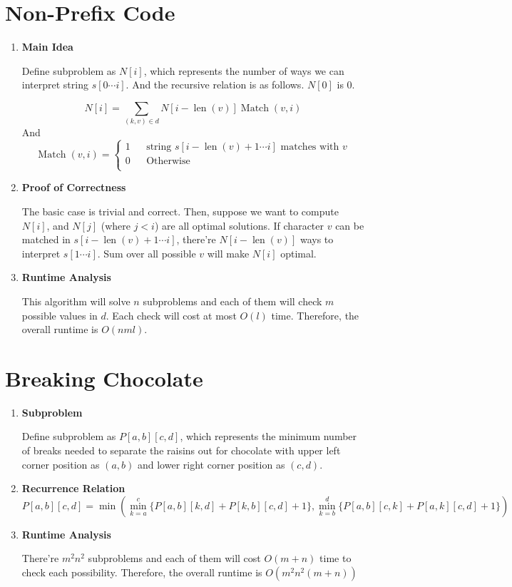 \documentclass[11pt]{article}
\newenvironment{qparts}{\begin{enumerate}[{(}a{)}]}{\end{enumerate}}
\begin{document}
\section{Non-Prefix Code}
\begin{qparts}
	\item \textbf{Main Idea}
	
	Define subproblem as $N[i]$, which represents the number of ways we can interpret string $s[0 \cdots i]$. And the recursive relation is as follows. $N[0]$ is 0.
	
	\[
		N[i] = \sum_{(k, v) \in d} N[i - \operatorname{len}(v)] \operatorname{Match}(v, i)
	\]
	And
	\[ \operatorname{Match}(v, i) = 
	\left\{
		\begin{array}{rcl}
			1     &      & \text{string } s[i - \operatorname{len}(v) + 1 \cdots i] \text{ matches with } v  \\
			0      &      & \text{Otherwise}  \\
		\end{array}
	\right.
	\]
	\item \textbf{Proof of Correctness}
	
	The basic case is trivial and correct. Then, suppose we want to compute $N[i]$, and $N[j]$ (where $j<i$) are all optimal solutions. If character $v$ can be matched in $s[i - \operatorname{len}(v) + 1 \cdots i]$, there're $N[i - \operatorname{len}(v)]$ ways to interpret $s[1 \cdots i]$. Sum over all possible $v$ will make $N[i]$ optimal.
	
	
	\item \textbf{Runtime Analysis}
	
	This algorithm will solve $n$ subproblems and each of them will check $m$ possible values in $d$. Each check will cost at most $O(l)$ time. Therefore, the overall runtime is $O(nml)$.
	

\end{qparts}


\newpage
\section{Breaking Chocolate}
\begin{qparts}
	\item \textbf{Subproblem}
	
	Define subproblem as $P[a,b][c, d]$, which represents the minimum 	number of breaks needed to separate the raisins out for chocolate with upper left corner position as $(a, b)$ and lower right corner position as $(c, d)$.
	
	\item \textbf{Recurrence Relation}
	\[
		P[a,b][c,d] = \min( \min_{k=a}^{c}\{ P[a, b][k, d] + P[k, b][c, d] + 1 \}, \min_{k=b}^{d}\{ P[a, b][c, k] + P[a, k][c, d] + 1 \})
	\]
	
	\item \textbf{Runtime Analysis}
	
	There're $m^2n^2$ subproblems and each of them will cost $O(m+n)$ time to check each possibility.
	Therefore, the overall runtime is $O(m^2n^2(m+n))$
	

\end{qparts}
\end{document}
